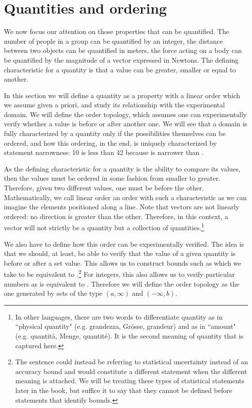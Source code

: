 \section{Quantities and ordering}

We now focus our attention on those properties that can be quantified. The number of people in a group can be quantified by an integer, the distance between two objects can be quantified in meters, the force acting on a body can be quantified by the magnitude of a vector expressed in Newtons. The defining characteristic for a quantity is that a value can be greater, smaller or equal to another.

In this section we will define a quantity as a property with a linear order which we assume given a priori, and study its relationship with the experimental domain. We will define the order topology, which assumes one can experimentally verify whether a value is before or after another one. We will see that a domain is fully characterized by a quantity only if the possibilities themselves can be ordered, and how this ordering, in the end, is uniquely characterized by statement narrowness: 10 is less than 42 because  is narrower than .

As the defining characteristic for a quantity is the ability to compare its values, then the values must be ordered in some fashion from smaller to greater. Therefore, given two different values, one must be before the other. Mathematically, we call linear order an order with such a characteristic as we can imagine the elements positioned along a line. Note that vectors are not linearly ordered: no direction is greater than the other. Therefore, in this context, a vector will not strictly be a quantity but a collection of quantities.\footnote{In other languages, there are two words to differentiate quantity as in ``physical quantity" (e.g. grandezza, Gr\"osse, grandeur) and as in ``amount" (e.g. quantit\`a, Menge, quantit\'e). It is the second meaning of quantity that is captured here.}

We also have to define how this order can be experimentally verified. The idea is that we should, at least, be able to verify that the value of a given quantity is before or after a set value. This allows us to construct bounds such as  which we take to be equivalent to .\footnote{The sentence  could instead be referring to statistical uncertainty instead of an accuracy bound and would constitute a different statement when the different meaning is attached. We will be treating these types of statistical statements later in the book, but suffice it to say that they cannot be defined before statements that identify bounds.} For integers, this also allows us to verify particular numbers as  is equivalent to . Therefore we will define the order topology as the one generated by sets of the type $(a, \infty)$ and $(-\infty, b)$.

